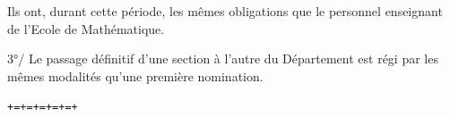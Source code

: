 
Ils ont, durant cette période, les mêmes obligations que le personnel enseignant de l'Ecole de Mathématique.

3°/ Le passage définitif d'une section à l'autre du Département est régi par les mêmes modalités qu'une première nomination.

\begin{center}\texttt{+=+=+=+=+=+}\end{center}
